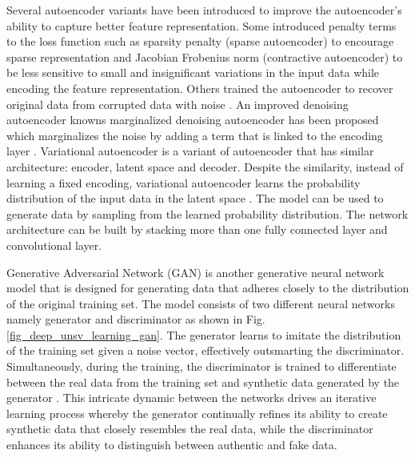 \documentclass[preprint,12pt]{elsarticle}
\begin{document}
Several autoencoder variants have been introduced to improve the autoencoder’s ability to capture better feature representation. Some introduced penalty terms to the loss function such as sparsity penalty (sparse autoencoder) \citep{ng_sparse_2011} to encourage sparse representation and Jacobian Frobenius norm (contractive autoencoder) \citep{rifai_higher_2011} to be less sensitive to small and insignificant variations in the input data while encoding the feature representation. Others trained the autoencoder to recover original data from corrupted data with noise \citep{vincent_extracting_2008}. An improved denoising autoencoder knowns marginalized denoising autoencoder has been proposed which marginalizes the noise by adding a term that is linked to the encoding layer \citep{chen_marginalized_2012}. Variational autoencoder is a variant of autoencoder that has similar architecture: encoder, latent space and decoder. Despite the similarity, instead of learning a fixed encoding, variational autoencoder learns the probability distribution of the input data in the latent space \citep{kingma_auto-encoding_2013}. The model can be used to generate data by sampling from the learned probability distribution. The network architecture can be built by stacking more than one fully connected layer and convolutional layer.

Generative Adversarial Network (GAN) is another generative neural network model that is designed for generating data that adheres closely to the distribution of the original training set. The model consists of two different neural networks namely generator and discriminator as shown in Fig. \ref{fig_deep_unsv_learning_gan}. The generator learns to imitate the distribution of the training set given a noise vector, effectively outsmarting the discriminator. Simultaneously, during the training, the discriminator is trained to differentiate between the real data from the training set and synthetic data generated by the generator \citep{goodfellow_generative_2014}. This intricate dynamic between the networks drives an iterative learning process whereby the generator continually refines its ability to create synthetic data that closely resembles the real data, while the discriminator enhances its ability to distinguish between authentic and fake data.
\end{document}
